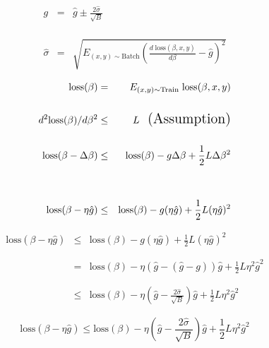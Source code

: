 {\vfill
\begin{eqnarray*}
  g & = & \hat{g} \pm \frac{2\hat{\sigma}}{\sqrt{B}} \\
  \\
  \\
  \\
  \hat{\sigma} & = & \sqrt{E_{(x,y) \sim \mathrm{Batch}} \left(\frac{d\;\mathrm{loss}(\beta,x,y)}{d \beta} - \hat{g}\right)^2}
\end{eqnarray*}


\begin{eqnarray*}
  \mathrm{loss}(\beta) & = & E_{(x,y) \sim \mathrm{Train}}\;\mathrm{loss}(\beta,x,y) \\
  \\
  d^2 \mathrm{loss}(\beta)/d \beta^2 & \leq & L \;\;\;\mbox{\Large (Assumption)} \\
  \\
  \mathrm{loss}(\beta - \Delta\beta) & \leq & \mathrm{loss}(\beta) - g\Delta \beta + \frac{1}{2}L\Delta \beta^2 \\
  \\
  \\
  \mathrm{loss}(\beta - \eta\hat{g}) & \leq & \mathrm{loss}(\beta) - g(\eta\hat{g}) + \frac{1}{2}L(\eta\hat{g})^2
\end{eqnarray*}


\begin{eqnarray*}
  \mathrm{loss}(\beta - \eta\hat{g}) & \leq & \mathrm{loss}(\beta) - g(\eta\hat{g}) + \frac{1}{2}L(\eta\hat{g})^2 \\
  \\
  \\
  & = &  \mathrm{loss}(\beta) - \eta (\hat{g} - (\hat{g} -g)) \hat{g} + \frac{1}{2}L\eta^2 \hat{g}^2 \\
  \\
  \\
  & \leq &  \mathrm{loss}(\beta) - \eta \left(\hat{g} - \frac{2\hat{\sigma}}{\sqrt{B}}\right)\hat{g} + \frac{1}{2}L \eta^2 \hat{g}^2
\end{eqnarray*}


$$\mathrm{loss}(\beta - \eta\hat{g}) \leq \mathrm{loss}(\beta) - \eta \left(\hat{g} - \frac{2\hat{\sigma}}{\sqrt{B}} \right)\hat{g}  + \frac{1}{2}L \eta^2 \hat{g}^2$$

}
